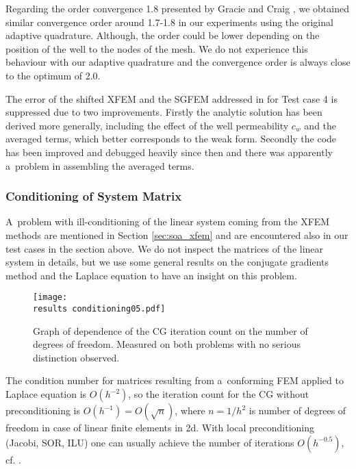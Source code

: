 Regarding the order convergence 1.8 presented by Gracie and Craig \cite{gracie_modelling_2010}, we obtained similar convergence order 
around 1.7-1.8 in our experiments using the original adaptive quadrature. Although, the order could be lower 
depending on the position of the well to the nodes of the mesh. We do not experience this behaviour with our adaptive
quadrature and the convergence order is always close to the optimum of 2.0.

The error of the shifted XFEM and the SGFEM addressed in \cite{exner_2016} for Test case 4 is suppressed due to two improvements. 
Firstly the analytic solution has been derived more generally, including the effect of the well permeability $c_w$
and the averaged terms, which better corresponds to the weak form.
Secondly the code has been improved and debugged heavily since then and there was apparently a~problem in assembling the averaged terms.



\subsubsection{Conditioning of System Matrix} \label{sec:res_conditioning}
A~problem with ill-conditioning of the linear system coming from the XFEM methods are mentioned in Section \ref{sec:soa_xfem}
and are encountered also in our test cases in the section above. We do not inspect the matrices of the linear system in details, 
but we use some general results on the conjugate gradients method and the Laplace equation to have an insight on this problem.

\begin{figure}[!htb]
  \centering    
    \texttt{[image: \\results conditioning05.pdf]}
  \caption[Iterations graph]{Graph of dependence of the CG iteration count on the 
  number of degrees of freedom. Measured on both problems with no serious distinction observed.}
  \label{fig:conditioning05}
\end{figure}
%

The condition number for matrices resulting from a~conforming FEM applied to Laplace equation is $O(h^{-2})$, so the iteration count 
for the CG without preconditioning is $O(h^{-1})=O(\sqrt{n})$, where $n=1/h^2$ is number of degrees of freedom in case of linear finite elements in 2d. 
With local preconditioning (Jacobi, SOR, ILU) one can usually achieve the number of iterations $O(h^{-0.5})$, cf. \cite{ern_evaluation_2006}.


